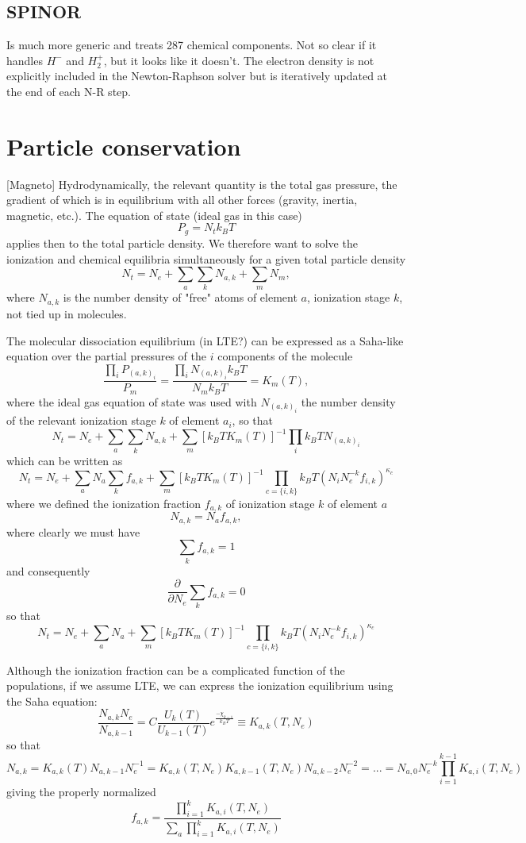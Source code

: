 \documentclass[a4paper]{article}
\begin{document}
\subsection{SPINOR}
Is much more generic and treats 287 chemical components. Not so clear if it handles $H^-$ and $H_2^+$, but it looks like it doesn't. The electron density is not explicitly included in the Newton-Raphson solver but is iteratively updated at the end of each N-R step. 

\section{Particle conservation}
[Magneto] Hydrodynamically, the relevant quantity is the total gas pressure, the gradient of which is in equilibrium with all other forces (gravity, inertia, magnetic, etc.). The equation of state (ideal gas in this case)
$$
P_g=N_t k_B T
$$
applies then to the total particle density. We therefore want to solve the ionization and chemical equilibria simultaneously for a given total particle density
$$
N_t=N_e + \sum_a \sum_k N_{a,k} + \sum_m N_m,
$$
where $N_{a,k}$ is the number density of "free" atoms of element $a$, ionization stage $k$, not tied up in molecules.

The molecular dissociation equilibrium (in LTE?) can be expressed as a Saha-like equation over the partial pressures of the $i$ 
components of the molecule
$$
\frac{\prod_i P_{(a,k)_i}}{P_m} = \frac{\prod_i N_{(a,k)_i} k_B T}{N_m k_B T} = K_m(T),
$$
where the ideal gas equation of state was used with $N_{(a,k)_i}$ the number density of the relevant 
ionization stage $k$ of element $a_i$, so that 
$$
N_t=N_e +  \sum_a \sum_k N_{a,k} + \sum_m  \left[k_B T K_m(T) \right]^{-1}\prod_i k_B T N_{(a,k)_i}
$$
which can be written as
$$
N_t = N_e +  \sum_a N_a \sum_k f_{a,k} + \sum_m \left[k_B T K_m(T)\right]^{-1} \prod_{c=\{i,k\}} k_B T \left( N_i N_e^{-k} f_{i,k}\right)^{\kappa_c}
$$
where we defined the ionization fraction $f_{a,k}$ of ionization stage $k$ of element $a$
$$
N_{a,k} = N_a f_{a,k},
$$
where clearly we must have
$$
 \sum_k f_{a,k} = 1
$$
and consequently
$$
\frac{\partial}{\partial N_e} \sum_k f_{a,k} = 0
$$
so that
$$
N_t = N_e +  \sum_a N_a + \sum_m \left[k_B T K_m(T)\right]^{-1} \prod_{c=\{i,k\}} k_B T \left( N_i N_e^{-k} f_{i,k}\right)^{\kappa_c}
$$

Although the ionization fraction can be a complicated function of the populations, if we assume LTE, we can 
express the ionization equilibrium using the Saha equation:
$$
\frac{N_{a,k} N_e}{N_{a,k-1}} = C \frac{U_{k}(T)}{U_{k-1}(T)}e^\frac{-\chi_{k-1}}{k_B T} \equiv K_{a,k}(T,N_e)
$$
so that
$$
N_{a,k} = K_{a,k}(T) N_{a,k-1} N_e^{-1} = K_{a,k}(T,N_e) K_{a,k-1}(T,N_e) N_{a,k-2} N_e^{-2} = ... = N_{a,0} N_e^{-k} \prod_{i=1}^{k-1} K_{a,i}(T,N_e)
$$
giving the properly normalized
$$
f_{a,k}=\frac{\prod_{i=1}^{k} K_{a,i}(T,N_e)}{\sum_a \prod_{i=1}^{k} K_{a,i}(T,N_e)}
$$
\end{document}
